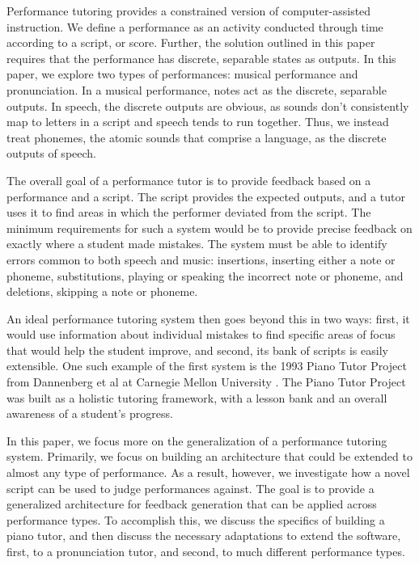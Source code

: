 \documentclass[twocolumn]{article}
\begin{document}
Performance tutoring provides a constrained version of computer-assisted instruction. We define a performance as an activity conducted through time according to a script, or score. Further, the solution outlined in this paper requires that the performance has discrete, separable states as outputs. In this paper, we explore two types of performances: musical performance and pronunciation. In a musical performance, notes act as the discrete, separable outputs. In speech, the discrete outputs are obvious, as sounds don’t consistently map to letters in a script and speech tends to run together. Thus, we instead treat phonemes, the atomic sounds that comprise a language, as the discrete outputs of speech.
 
 

The overall goal of a performance tutor is to provide feedback based on a performance and a script. The script provides the expected outputs, and a tutor uses it to find areas in which the performer deviated from the script. The minimum requirements for such a system would be to provide precise feedback on exactly where a student made mistakes. The system must be able to identify errors common to both speech and music: insertions, inserting either a note or phoneme, substitutions, playing or speaking the incorrect note or phoneme, and deletions, skipping a note or phoneme.

An ideal performance tutoring system then goes beyond this in two ways: first, it would use information about individual mistakes to find specific areas of focus that would help the student improve, and second, its bank of scripts is easily extensible. One such example of the first system is the 1993 Piano Tutor Project from Dannenberg et al at Carnegie Mellon University \cite{dannenberg1993results}. The Piano Tutor Project was built as a holistic tutoring framework, with a lesson bank and an overall awareness of a student’s progress.

In this paper, we focus more on the generalization of a performance tutoring system. Primarily, we focus on building an architecture that could be extended to almost any type of performance. As a result, however, we investigate how a novel script can be used to judge performances against. The goal is to provide a generalized architecture for feedback generation that can be applied across performance types. To accomplish this, we discuss the specifics of building a piano tutor, and then discuss the necessary adaptations to extend the software, first, to a pronunciation tutor, and second, to much different performance types.
\end{document}
